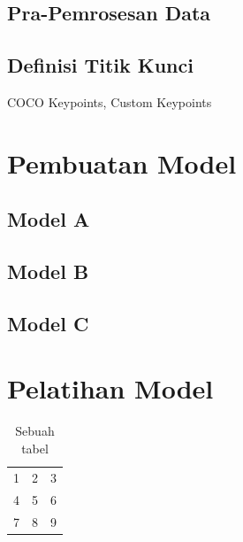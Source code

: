 \subsection{Pra-Pemrosesan Data}

\subsection{Definisi Titik Kunci}
COCO Keypoints, Custom Keypoints

\section{Pembuatan Model} \label{sec:3-PerancanganModel}
\subsection{Model A}
\subsection{Model B}
\subsection{Model C}

\section{Pelatihan Model} \label{sec:3-PelatihanModel}

\begin{table}[htbp]
    \captionsetup{labelfont=bf, textfont=bf}
    \caption{Sebuah tabel}
    \vspace{-20pt}
    \begin{center}
        \begin{tabular}{| l c r |}
            \hline
            1 & 2 & 3 \\
            4 & 5 & 6 \\
            7 & 8 & 9 \\
            \hline
        \end{tabular}
    \end{center}
    \vspace{-10pt}
    \captionsetup{labelfont=md, textfont=md}
\end{table}